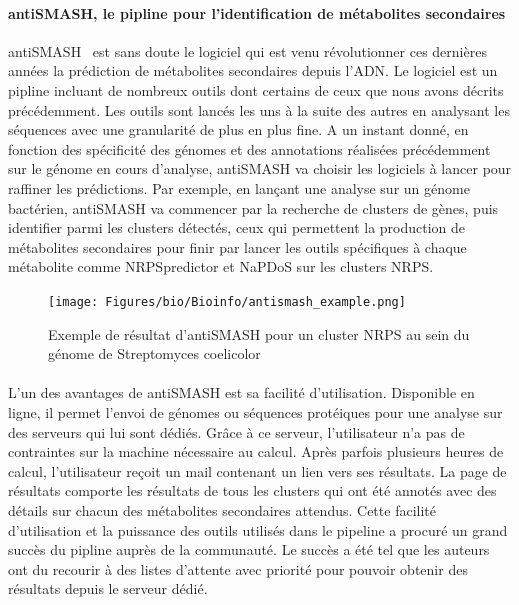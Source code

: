 \documentclass[12pt,french,twoside]{report}
\begin{document}
\paragraph{antiSMASH, le pipline pour l'identification de métabolites secondaires}
antiSMASH~\cite{weber_antismash_2015,medema_antismash:_2011} est sans doute le logiciel qui est venu révolutionner ces dernières années la prédiction de métabolites secondaires depuis l'ADN.
Le logiciel est un pipline incluant de nombreux outils dont certains de ceux que nous avons décrits précédemment.
Les outils sont lancés les uns à la suite des autres en analysant les séquences avec une granularité de plus en plus fine.
A un instant donné, en fonction des spécificité des génomes et des annotations réalisées précédemment sur le génome en cours d'analyse, antiSMASH va choisir les logiciels à lancer pour raffiner les prédictions.
Par exemple, en lançant une analyse sur un génome bactérien, antiSMASH va commencer par la recherche de clusters de gènes, puis identifier parmi les clusters détectés, ceux qui permettent la production de métabolites secondaires pour finir par lancer les outils spécifiques à chaque métabolite comme NRPSpredictor et NaPDoS sur les clusters NRPS.

\begin{figure}
  \begin{center}
    \texttt{[image: Figures/bio/Bioinfo/antismash\_example.png]}
    \caption{\label{antismash_result}Exemple de résultat d'antiSMASH pour un cluster NRPS au sein du génome de Streptomyces coelicolor}
  \end{center}
\end{figure}

\paragraph{}L'un des avantages de antiSMASH est sa facilité d'utilisation.
Disponible en ligne, il permet l'envoi de génomes ou séquences protéiques pour une analyse sur des serveurs qui lui sont dédiés.
Grâce à ce serveur, l'utilisateur n'a pas de contraintes sur la machine nécessaire au calcul.
Après parfois plusieurs heures de calcul, l'utilisateur reçoit un mail contenant un lien vers ses résultats.
La page de résultats comporte les résultats de tous les clusters qui ont été annotés avec des détails sur chacun des métabolites secondaires attendus.
Cette facilité d'utilisation et la puissance des outils utilisés dans le pipeline a procuré un grand succès du pipline auprès de la communauté.
Le succès a été tel que les auteurs ont du recourir à des listes d'attente avec priorité pour pouvoir obtenir des résultats depuis le serveur dédié.
\end{document}
